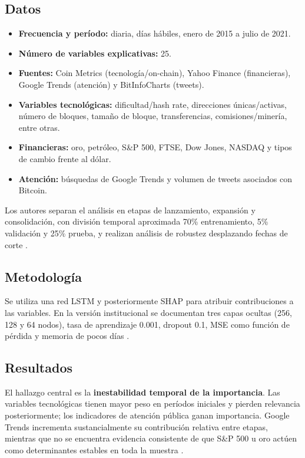 \documentclass[11pt,letterpaper]{article}
\begin{document}
\subsection{Datos}
\begin{itemize}
  \item \textbf{Frecuencia y período:} diaria, días hábiles, enero de 2015 a julio de 2021.
  \item \textbf{Número de variables explicativas:} 25.
  \item \textbf{Fuentes:} Coin Metrics (tecnología/on-chain), Yahoo Finance (financieras), Google Trends (atención) y BitInfoCharts (tweets).
  \item \textbf{Variables tecnológicas:} dificultad/hash rate, direcciones únicas/activas, número de bloques, tamaño de bloque, transferencias, comisiones/minería, entre otras.
  \item \textbf{Financieras:} oro, petróleo, S\&P 500, FTSE, Dow Jones, NASDAQ y tipos de cambio frente al dólar.
  \item \textbf{Atención:} búsquedas de Google Trends y volumen de tweets asociados con Bitcoin.
\end{itemize}

Los autores separan el análisis en etapas de lanzamiento, expansión y consolidación, con división temporal aproximada 70\% entrenamiento, 5\% validación y 25\% prueba, y realizan análisis de robustez desplazando fechas de corte \parencite{carbo2022wp}.

\subsection{Metodología}
Se utiliza una red LSTM y posteriormente SHAP para atribuir contribuciones a las variables. En la versión institucional se documentan tres capas ocultas (256, 128 y 64 nodos), tasa de aprendizaje 0.001, dropout 0.1, MSE como función de pérdida y memoria de pocos días \parencite{carbo2022wp}.

\subsection{Resultados}
El hallazgo central es la \textbf{inestabilidad temporal de la importancia}. Las variables tecnológicas tienen mayor peso en períodos iniciales y pierden relevancia posteriormente; los indicadores de atención pública ganan importancia. Google Trends incrementa sustancialmente su contribución relativa entre etapas, mientras que no se encuentra evidencia consistente de que S\&P 500 u oro actúen como determinantes estables en toda la muestra \parencite{carbo2022wp}.
\end{document}
